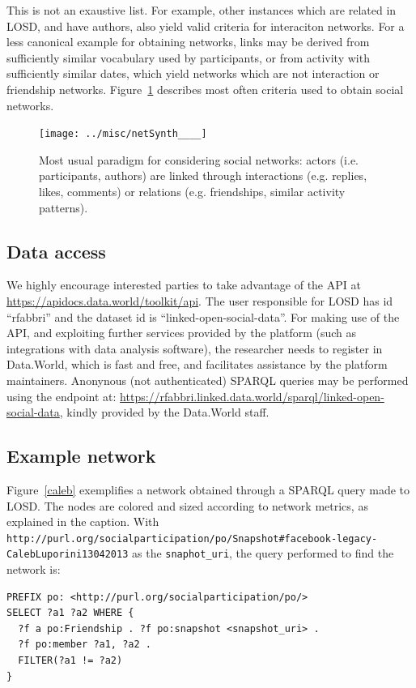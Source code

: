 \documentclass[data,datadescriptor,submit,moreauthors,pdftex]{Definitions/mdpi}
\newcommand{\te}[1] {\texttt{\footnotesize#1}}
\begin{document}
This is not an exaustive list.
For example, other instances which are related in LOSD, and have authors,
also yield valid criteria for interaciton networks.
For a less canonical example for obtaining networks, links may be derived from sufficiently similar vocabulary used by participants, or from activity with sufficiently similar dates, which yield networks which are not interaction or friendship networks.
Figure~\ref{fnet} describes most often criteria used to obtain social networks.

\begin{figure}[H]
    \centering
    \texttt{[image: ../misc/netSynth\_\_\_\_]}
    \caption{Most usual paradigm for considering social networks:
    actors (i.e. participants, authors) are linked through interactions
    (e.g. replies, likes, comments)
    or relations (e.g. friendships, similar activity patterns).}\label{fnet}
\end{figure}

\subsection{Data access}\label{sac}
We highly encourage interested parties to take advantage of the API at \url{https://apidocs.data.world/toolkit/api}.
The user responsible for LOSD has id ``rfabbri'' and the dataset id is ``linked-open-social-data''.
For making use of the API, and exploiting further services provided by the platform (such as integrations with data analysis software), the researcher needs to register in Data.World, which is fast and free, and facilitates assistance by the platform maintainers.
Anonynous (not authenticated) SPARQL queries may be performed using the endpoint at: \url{https://rfabbri.linked.data.world/sparql/linked-open-social-data}, kindly provided by the Data.World staff.

\subsection{Example network}\label{sex}
Figure~\ref{caleb} exemplifies a network obtained through a SPARQL query made to LOSD. The nodes are colored and sized according to network metrics, as explained in the caption. With \te{http://purl.org/socialparticipation/po/Snapshot\#facebook-legacy-CalebLuporini13042013} as the \te{snaphot\_uri}, the query performed to find the network is:
\begin{lstlisting}[language=spq]
PREFIX po: <http://purl.org/socialparticipation/po/>
SELECT ?a1 ?a2 WHERE {
  ?f a po:Friendship . ?f po:snapshot <snapshot_uri> .
  ?f po:member ?a1, ?a2 .
  FILTER(?a1 != ?a2)
}
\end{lstlisting}
\end{document}
